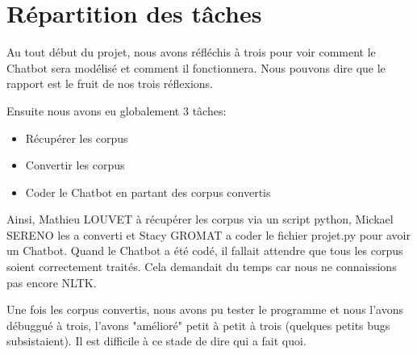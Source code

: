 \section{Répartition des tâches}
	Au tout début du projet, nous avons réfléchis à trois pour voir comment le Chatbot sera modélisé et comment il fonctionnera. Nous pouvons dire que le rapport est le fruit de nos trois réflexions.

	Ensuite nous avons eu globalement 3 tâches:
	\begin{itemize}
		\item Récupérer les corpus
		\item Convertir les corpus
		\item Coder le Chatbot en partant des corpus convertis
	\end{itemize}

	Ainsi, Mathieu LOUVET à récupérer les corpus via un script python, Mickael SERENO les a converti et Stacy GROMAT a coder le fichier projet.py pour avoir un Chatbot.
	Quand le Chatbot a été codé, il fallait attendre que tous les corpus soient correctement traités. Cela demandait du temps car nous ne connaissions pas encore NLTK.

	Une fois les corpus convertis, nous avons pu tester le programme et nous l'avons débuggué à trois, l'avons "amélioré" petit à petit à trois (quelques petits bugs subsistaient). Il est difficile à ce stade de dire qui a fait quoi.

